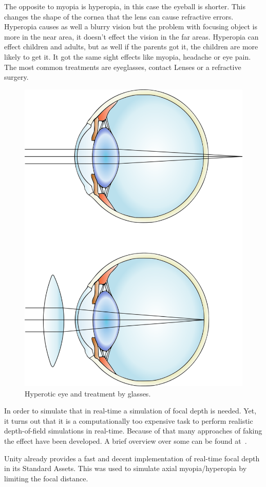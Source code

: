 \documentclass{sig-alternate-05-2015}
\begin{document}
The opposite to myopia is hyperopia, in this case the eyeball is shorter. This changes the shape of the cornea that the lens can cause refractive errors. Hyperopia causes as well a blurry vision but the problem with focusing object is more in the near area, it doesn't effect the vision in the far areas. Hyperopia can effect children and adults, but as well if the parents got it, the children are more likely to get it. It got the same sight effects like myopia, headache or eye pain. The most common treatments are eyeglasses, contact Lenses or a refractive surgery. 
%
\begin{figure}
    \centering
    \includegraphics[width=0.7\columnwidth]{hyperopia.png}
    \caption{Hyperotic eye and treatment by glasses.}
    \label{fig:hyperopia}
\end{figure}
%
In order to simulate that in real-time a simulation of focal depth is needed.
Yet, it turns out that it is a computationally too expensive task to perform realistic depth-of-field simulations in real-time.
Because of that many approaches of faking the effect have been developed.
A brief overview over some can be found at~\cite{gpugems-DoF}.

Unity already provides a fast and decent implementation of real-time focal depth in its Standard Assets.
This was used to simulate axial myopia/hyperopia by limiting the focal distance.
\end{document}
